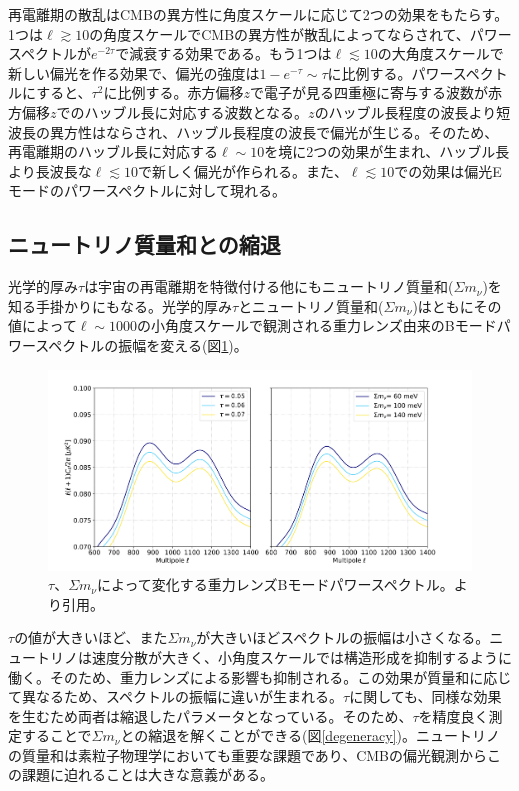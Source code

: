 再電離期の散乱はCMBの異方性に角度スケールに応じて2つの効果をもたらす。1つは$\ell\gtrsim 10$の角度スケールでCMBの異方性が散乱によってならされて、パワースペクトルが$e^{-2\tau}$で減衰する効果である。もう1つは$\ell\lesssim 10$の大角度スケールで新しい偏光を作る効果で、偏光の強度は$1-e^{-\tau}\sim\tau$に比例する。パワースペクトルにすると、$\tau^{2}$に比例する。赤方偏移$z$で電子が見る四重極に寄与する波数が赤方偏移$z$でのハッブル長に対応する波数となる。$z$のハッブル長程度の波長より短波長の異方性はならされ、ハッブル長程度の波長で偏光が生じる。そのため、再電離期のハッブル長に対応する$\ell\sim 10$を境に2つの効果が生まれ、ハッブル長より長波長な$\ell\lesssim 10$で新しく偏光が作られる。また、$\ell\lesssim 10$での効果は偏光Eモードのパワースペクトルに対して現れる。

\subsection{ニュートリノ質量和との縮退}
光学的厚み$\tau$は宇宙の再電離期を特徴付ける他にもニュートリノ質量和($\Sigma m_{\nu}$)を知る手掛かりにもなる。光学的厚み$\tau$とニュートリノ質量和($\Sigma m_{\nu}$)はともにその値によって$\ell\sim 1000$の小角度スケールで観測される重力レンズ由来のBモードパワースペクトルの振幅を変える(図\ref{tau_mass})。
\begin{figure}[htbp]
  \centering
  \includegraphics[width=1.0\columnwidth]{2_cosmology/figs/tau_mass.png}
  \caption{$\tau$、$\Sigma m_{\nu}$によって変化する重力レンズBモードパワースペクトル。\cite{sueno_doctor}より引用。}
  \label{tau_mass}
\end{figure}
$\tau$の値が大きいほど、また$\Sigma m_{\nu}$が大きいほどスペクトルの振幅は小さくなる。ニュートリノは速度分散が大きく、小角度スケールでは構造形成を抑制するように働く。そのため、重力レンズによる影響も抑制される。この効果が質量和に応じて異なるため、スペクトルの振幅に違いが生まれる。$\tau$に関しても、同様な効果を生むため両者は縮退したパラメータとなっている。そのため、$\tau$を精度良く測定することで$\Sigma m_{\nu}$との縮退を解くことができる(図\ref{degeneracy})。ニュートリノの質量和は素粒子物理学においても重要な課題であり、CMBの偏光観測からこの課題に迫れることは大きな意義がある。
